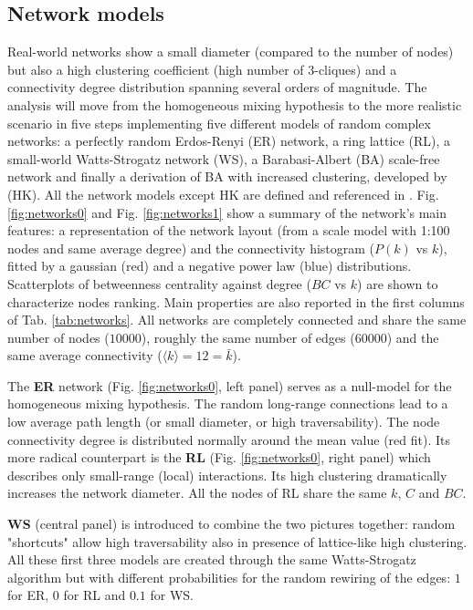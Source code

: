 \documentclass[DIV=12, BCOR=0pt]{scrartcl}  %
\begin{document}
  \subsection{Network models}
  Real-world networks show a small diameter (compared to the number of nodes) but also a high clustering coefficient (high number of 3-cliques) and a connectivity degree distribution spanning several orders of magnitude.
  The analysis will move from the homogeneous mixing hypothesis to the more realistic scenario in five steps implementing five different models of random complex networks: a perfectly random Erdos-Renyi (ER) network, a ring lattice (RL), a small-world Watts-Strogatz network (WS), a Barabasi-Albert (BA) scale-free network and finally a derivation of BA with increased clustering, developed by \citet{Holme} (HK). All the network models except HK are defined and referenced in \citet{PastorSatorras}.
  Fig. \ref{fig:networks0} and Fig. \ref{fig:networks1} show a summary of the network's main features: a representation of the network layout (from a scale model with 1:100 nodes and same average degree) and the connectivity histogram ($P(k)$ vs $k$), fitted by a gaussian (red) and a negative power law (blue) distributions.   
  Scatterplots of betweenness centrality against degree ($BC$ vs $k$) are shown to characterize nodes ranking.  Main properties are also reported in the first columns of Tab. \ref{tab:networks}. All networks are completely connected and share the same number of nodes ($10000$), roughly the same number of edges ($60000$) and the same average connectivity ($\langle k \rangle = 12 = \bar{k}$).
  
  The \textbf{ER} network (Fig. \ref{fig:networks0}, left panel) serves as a null-model for the homogeneous mixing hypothesis. The random long-range connections lead to a low average path length (or small diameter, or high traversability). The node connectivity degree is distributed normally around the mean value (red fit). 
  Its more radical counterpart is the \textbf{RL} (Fig. \ref{fig:networks0}, right panel) which describes only small-range (local) interactions. Its high clustering dramatically increases the network diameter. All the nodes of RL share the same $k$, $C$ and $BC$. 
  
  \textbf{WS} (central panel) is introduced to combine the two pictures together: random "shortcuts" allow high traversability also in presence of lattice-like high clustering. All these first three models are created through the same Watts-Strogatz algorithm but with different probabilities for the random rewiring of the edges: $1$ for ER, $0$ for RL and $0.1$ for WS.
  
\end{document}
